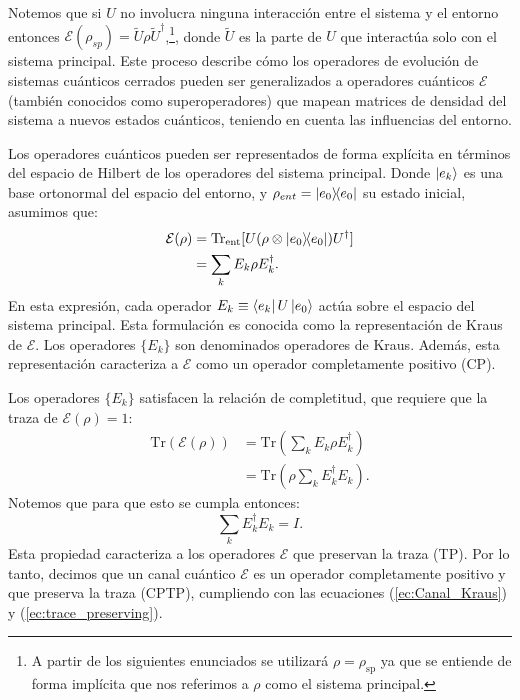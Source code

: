 \documentclass[letterpaper,12pt]{thesisECFM}
\theoremstyle{plain}
\theoremstyle{definition}
\theoremstyle{definition}
\theoremstyle{remark}
\newcommand{\1}{\mathbb{1}}
\begin{document}
Notemos que si $U$ no involucra ninguna interacción entre el sistema y el entorno entonces  $\mathcal{E}(\rho_{sp}) =  \widetilde{U} \rho \widetilde{U}^\dagger$,\footnote{A partir de los siguientes enunciados se utilizará $\rho = \rho_{\text{sp}}$ ya que se entiende de forma implícita que nos referimos a $\rho$ como el sistema principal.}, donde $\widetilde{U}$ es la parte de $U$ que interactúa solo con el sistema principal. 
Este proceso describe cómo los operadores de evolución de sistemas cuánticos cerrados pueden ser generalizados a operadores cuánticos $\mathcal{E}$ (también conocidos como superoperadores) que mapean matrices de densidad del sistema a nuevos estados cuánticos, teniendo en cuenta las influencias del entorno.

Los operadores cuánticos pueden ser representados de forma explícita en términos del espacio de Hilbert de los operadores del sistema principal. Donde $\ket{e_k}$ es una base ortonormal del espacio del entorno, y $\rho_{ent} = \ketbra{e_0}$ su estado inicial, asumimos que:
\begin{align}
\mathcal{E}(\rho) &= \text{Tr}_{\text{ent}}[ U(\rho \otimes \ketbra{e_0}) U^\dagger ] \\
&= \sum_k E_k \rho E_k^\dagger.  \label{ec:Canal_Kraus}
\end{align}
En esta expresión, cada operador $E_k \equiv \bra{e_k} U \ket{e_0}$ actúa sobre el espacio del sistema principal. Esta formulación es conocida como la representación de Kraus de $\mathcal{E}$. Los operadores $\{E_k\}$ son denominados operadores de Kraus. Además, esta representación caracteriza a $\mathcal{E}$ como un operador completamente positivo (CP).

Los operadores $\{E_k\}$  satisfacen la relación de completitud, que requiere que la traza de $\mathcal{E}(\rho) = 1$:
\begin{align}
    \text{Tr}(\mathcal{E}(\rho)) &= \text{Tr}\left(\sum_k E_k \rho E_k^\dagger\right) \\
    &= \text{Tr}\left(\rho \sum_k E_k^\dagger E_k \right).
\end{align}
Notemos que para que esto se cumpla entonces:
\begin{equation}
    \sum_k E_k^\dagger E_k = I. \label{ec:trace_preserving}
\end{equation}
Esta propiedad caracteriza a los operadores $\mathcal{E}$ que preservan la traza (TP). Por lo tanto, decimos que un canal cuántico $\mathcal{E}$ es un operador completamente positivo y  que preserva la traza (CPTP), cumpliendo con las ecuaciones (\ref{ec:Canal_Kraus})  y (\ref{ec:trace_preserving}). 
\end{document}
